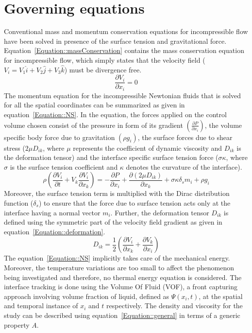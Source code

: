 \section{Governing equations}
Conventional mass and momentum conservation equations for incompressible flow have been solved in presence of the surface tension and gravitational force. Equation~\ref{Equation::massConservation} contains the mass conservation equation for incompressible flow, which simply states that the velocity field ($V_i = V_1\hat{i} + V_2\hat{j} + V_3\hat{k}$) must be divergence free. 
\begin{equation}\label{Equation::massConservation}
\frac{\partial V_i}{\partial x_i} = 0
\end{equation}
The momentum equation for the incompressible Newtonian fluids that is solved for all the spatial coordinates can be summarized as given in equation~\ref{Equation::NS}. In the equation, the forces applied on the control volume chosen consist of the pressure in form of its gradient $\left(\frac{\partial P}{\partial x_i}\right)$, the volume specific body force due to gravitation $\left(\rho g_i\right)$, the surface forces due to shear stress ($2\mu D_{ik}$, where $\mu$ represents the coefficient of dynamic viscosity and $D_{ik}$ is the deformation tensor) and the interface specific surface tension force ($\sigma \kappa$, where $\sigma$ is the surface tension coefficient and $\kappa$ denotes the curvature of the interface). 
\begin{equation}\label{Equation::NS}
\rho\left(\frac{\partial V_i}{\partial t} + V_k\frac{\partial V_i}{\partial x_k}\right) = -\frac{\partial P}{\partial x_i} + \frac{\partial(2\mu D_{ik})}{\partial x_k} + \sigma\kappa\delta_sm_i + \rho g_i
\end{equation}
Moreover, the surface tension term is multiplied with the Dirac distribution function ($\delta_s$) to ensure that the force due to surface tension acts only at the interface having a normal vector $m_i$. Further, the deformation tensor $D_{ik}$ is defined using the symmetric part of the velocity field gradient as given in equation~\ref{Equation::deformation}.
\begin{equation}\label{Equation::deformation}
D_{ik} = \frac{1}{2}\left(\frac{\partial V_i}{\partial x_k} + \frac{\partial V_k}{\partial x_i}\right)
\end{equation}
The equation~\ref{Equation::NS} implicitly takes care of the mechanical energy. Moreover, the temperature variations are too small to affect the phenomenon being investigated and therefore, no thermal energy equation is considered. The interface tracking is done using the Volume Of Fluid (VOF), a front capturing approach involving volume fraction of liquid, defined as $\Psi(x_i, t)$, at the spatial and temporal instance of $x_i$ and $t$ respectively. The density and viscosity for the study can be described using equation~\ref{Equation::general} in terms of a generic property $A$.
